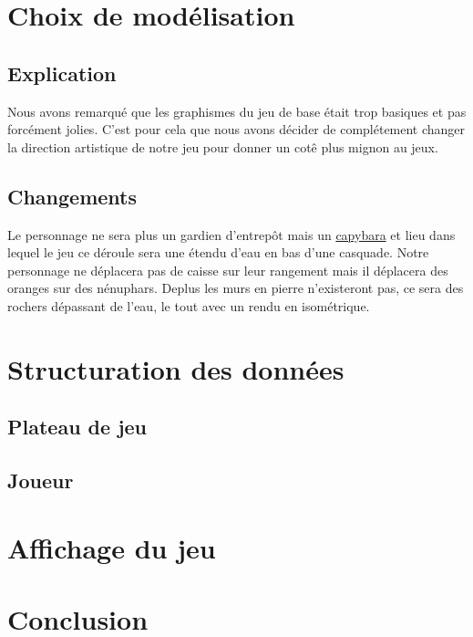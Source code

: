 \documentclass[french, 12pt]{article}
\begin{document}
\section{Choix de  modélisation} %

    \subsection{Explication}
        Nous avons remarqué que les graphismes du jeu de base était trop basiques et pas forcément jolies. C'est pour cela que nous avons décider de complétement changer la direction artistique de notre jeu pour donner un cotê plus mignon au jeux.

    \subsection{Changements}
        Le personnage ne sera plus un gardien d'entrepôt mais un \href{https://fr.wikipedia.org/wiki/Hydrochoerus_hydrochaeris}{capybara} et lieu dans lequel le jeu ce déroule sera une étendu d'eau en bas d'une casquade. Notre personnage ne déplacera pas de caisse sur leur rangement mais il déplacera des oranges sur des nénuphars. 
        Deplus les murs en pierre n'existeront pas, ce sera des rochers dépassant de l'eau, le tout avec un rendu en isométrique.





\section{Structuration des données}

    \subsection{Plateau de jeu}

    \subsection{Joueur}


\section{Affichage du jeu}

\section{Conclusion}
\end{document}

